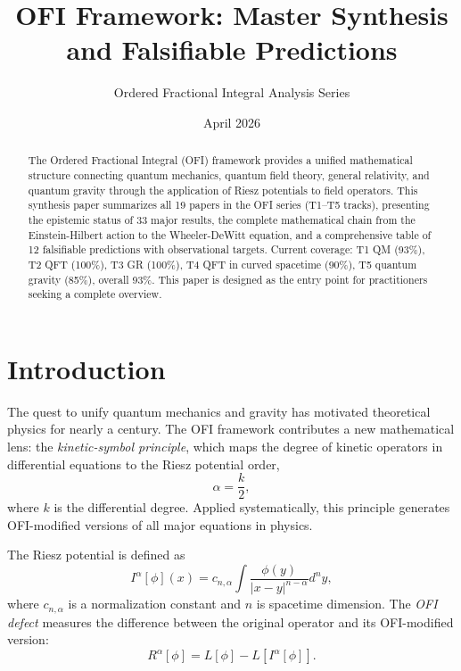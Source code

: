 \documentclass[12pt,a4paper]{article}
\title{\textbf{OFI Framework: Master Synthesis and Falsifiable Predictions}}
\author{Ordered Fractional Integral Analysis Series}
\date{April 2026}
\theoremstyle{definition}
\newcommand{\Ialpha}{I^{\alpha}}
\newcommand{\defect}[1]{R^{#1}}
\begin{document}
\maketitle

\begin{abstract}
The Ordered Fractional Integral (OFI) framework provides a unified mathematical structure connecting quantum mechanics, quantum field theory, general relativity, and quantum gravity through the application of Riesz potentials to field operators. This synthesis paper summarizes all 19 papers in the OFI series (T1--T5 tracks), presenting the epistemic status of 33 major results, the complete mathematical chain from the Einstein-Hilbert action to the Wheeler-DeWitt equation, and a comprehensive table of 12 falsifiable predictions with observational targets. Current coverage: T1 QM (93\%), T2 QFT (100\%), T3 GR (100\%), T4 QFT in curved spacetime (90\%), T5 quantum gravity (85\%), overall 93\%. This paper is designed as the entry point for practitioners seeking a complete overview.
\end{abstract}

\tableofcontents
\newpage

\section{Introduction}

The quest to unify quantum mechanics and gravity has motivated theoretical physics for nearly a century. The OFI framework contributes a new mathematical lens: the \textit{kinetic-symbol principle}, which maps the degree of kinetic operators in differential equations to the Riesz potential order,
\begin{equation}
\alpha = \frac{k}{2},
\end{equation}
where $k$ is the differential degree. Applied systematically, this principle generates OFI-modified versions of all major equations in physics.

The Riesz potential is defined as
\begin{equation}
\Ialpha[\phi](x) = c_{n,\alpha} \int \frac{\phi(y)}{|x-y|^{n-\alpha}} d^n y,
\end{equation}
where $c_{n,\alpha}$ is a normalization constant and $n$ is spacetime dimension. The \textit{OFI defect} measures the difference between the original operator and its OFI-modified version:
\begin{equation}
\defect{\alpha}[\phi] = L[\phi] - L[\Ialpha[\phi]].
\end{equation}
\end{document}
